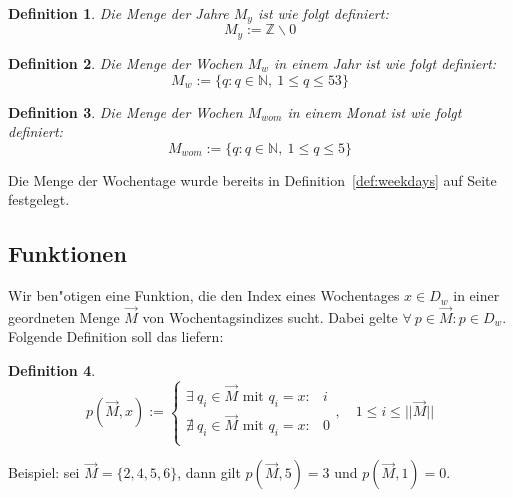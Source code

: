 \documentclass[a4paper]{article}
\numberwithin{equation}{section}
\newtheorem{dfn}{Definition}
\begin{document}
\begin{dfn}
  Die Menge der Jahre $M_y$ ist wie folgt definiert:
  \begin{equation}M_y := \mathbb{Z} \backslash 0\end{equation}
\end{dfn}

\begin{dfn}
  Die Menge der Wochen $M_w$ in einem Jahr ist wie folgt definiert:
  \begin{equation}
    M_w := \{ q : q \in \mathbb{N},\ 1 \le q \le 53 \}
  \end{equation}
\end{dfn}

\begin{dfn}
  Die Menge der Wochen $M_{wom}$ in einem Monat ist wie folgt definiert:
  \begin{equation}
    M_{wom} := \{ q : q \in \mathbb{N},\ 1 \le q \le 5 \}
  \end{equation}
\end{dfn}

\noindent Die Menge der Wochentage wurde bereits in
Definition~\ref{def:weekdays} auf Seite~\pageref{def:weekdays} festgelegt.


%
%
\subsection{Funktionen}
Wir ben"otigen eine Funktion, die den Index eines Wochentages $x \in D_w$ in
einer geordneten Menge $\vec{M}$ von Wochentagsindizes sucht. Dabei gelte
$\forall\ p \in \vec{M} : p \in D_w$. Folgende Definition soll das liefern:
\begin{dfn}
\begin{equation}
  p(\vec{M}, x) := \left\{\begin{array}{ll}
  \exists\ q_i \in \vec{M} \textrm{ mit } q_i = x : & i \\
  \nexists\ q_i \in \vec{M} \textrm{ mit } q_i = x : & 0 \\
  \end{array}\right.,\quad
  1 \le i \le ||\vec{M}||
\end{equation}
\end{dfn}
\noindent Beispiel: sei $\vec{M} = \{2, 4, 5, 6\}$, dann gilt
$p(\vec{M}, 5) = 3$ und $p(\vec{M}, 1) = 0$.
\end{document}
